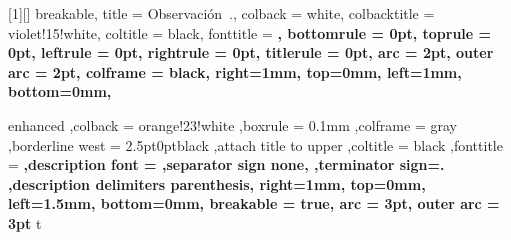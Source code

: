 [1][]
{
    breakable,
    title = Observación~\thetcbcounter.,
    colback = white,
    colbacktitle = violet!15!white,
    coltitle = black,
    fonttitle = \bfseries,
    bottomrule = 0pt,
    toprule = 0pt,
    leftrule = 0pt,
    rightrule = 0pt,
    titlerule = 0pt,
    arc = 2pt,
    outer arc = 2pt,
    colframe = black,
    right=1mm,
    top=0mm,
    left=1mm,
    bottom=0mm,
}




{
    enhanced
    ,colback = orange!23!white
    ,boxrule = 0.1mm
    ,colframe = gray
    ,borderline west = {2.5pt}{0pt}{black}
    ,attach title to upper
    ,coltitle = black
    ,fonttitle = \bfseries
    ,description font = \mdseries
    ,separator sign none,
    ,terminator sign={.\hspace{2mm}}
    ,description delimiters parenthesis,
    right=1mm,
    top=0mm,
    left=1.5mm,
    bottom=0mm,
    breakable = true,
    arc = 3pt,
    outer arc = 3pt
}
{t}